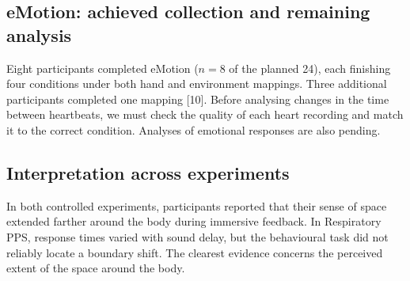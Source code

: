 \subsection{eMotion: achieved collection and remaining analysis}
\label{sec:s6-results}
Eight participants completed eMotion ($n=8$ of the planned 24), each finishing four conditions under both hand and environment mappings. Three additional participants completed one mapping [10]. Before analysing changes in the time between heartbeats, we must check the quality of each heart recording and match it to the correct condition. Analyses of emotional responses are also pending.

\subsection{Interpretation across experiments}
In both controlled experiments, participants reported that their sense of space extended farther around the body during immersive feedback. In Respiratory PPS, response times varied with sound delay, but the behavioural task did not reliably locate a boundary shift. The clearest evidence concerns the perceived extent of the space around the body.
